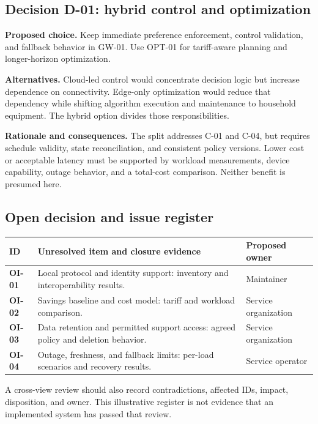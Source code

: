 \documentclass[11pt,letterpaper]{article}
\newcommand{\id}[1]{\textsf{\textbf{#1}}}
\newcommand{\tablehead}[1]{\sffamily\bfseries\color{Navy}#1}
\begin{document}
\subsection{Decision D-01: hybrid control and optimization}
\textbf{Proposed choice.} Keep immediate preference enforcement, control
validation, and fallback behavior in GW-01. Use OPT-01 for tariff-aware planning
and longer-horizon optimization.

\textbf{Alternatives.} Cloud-led control would concentrate decision logic but
increase dependence on connectivity. Edge-only optimization would reduce that
dependency while shifting algorithm execution and maintenance to household
equipment. The hybrid option divides those responsibilities.

\textbf{Rationale and consequences.} The split addresses C-01 and C-04, but
requires schedule validity, state reconciliation, and consistent policy versions.
Lower cost or acceptable latency must be supported by workload measurements,
device capability, outage behavior, and a total-cost comparison. Neither benefit
is presumed here.

\subsection{Open decision and issue register}
{\small
\begin{tabularx}{\linewidth}{@{}L{0.44in}Y L{1.18in}@{}}
\toprule
\tablehead{ID} & \tablehead{Unresolved item and closure evidence} & \tablehead{Proposed owner}\\
\midrule
\id{OI-01} & Local protocol and identity support: inventory and interoperability results. & Maintainer\\
\id{OI-02} & Savings baseline and cost model: tariff and workload comparison. & Service organization\\
\id{OI-03} & Data retention and permitted support access: agreed policy and deletion behavior. & Service organization\\
\id{OI-04} & Outage, freshness, and fallback limits: per-load scenarios and recovery results. & Service operator\\
\bottomrule
\end{tabularx}}

{\footnotesize\color{Muted}A cross-view review should also record contradictions,
affected IDs, impact, disposition, and owner. This illustrative register is not
evidence that an implemented system has passed that review.}

\newpage
\end{document}
